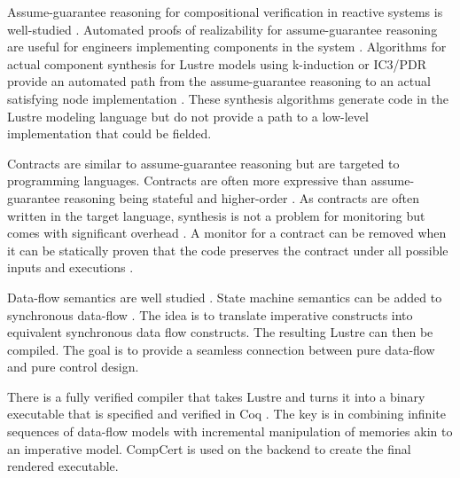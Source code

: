 Assume-guarantee reasoning for compositional verification in reactive systems is well-studied \cite{10.1007/978-3-642-28891-3_13, agree2013, 10.1145/2658982.2527272, 10.1007/978-3-319-17524-9_7}. Automated proofs of realizability for assume-guarantee reasoning are useful for engineers implementing components in the system \cite{10.1007/978-3-319-17524-9_13, 10.1007/978-3-319-29613-5_7}. Algorithms for actual component synthesis for Lustre models using k-induction or IC3/PDR provide an automated path from the assume-guarantee reasoning to an actual satisfying node implementation \cite{katis2017synthesis, 10.1007/978-3-319-89963-3_10}. These synthesis algorithms generate code in the Lustre modeling language but do not provide a path to a low-level implementation that could be fielded.

Contracts are similar to assume-guarantee reasoning but are targeted to programming languages. Contracts are often more expressive than assume-guarantee reasoning being stateful and higher-order \cite{10.1145/583852.581484}. As contracts are often written in the target language, synthesis is not a problem for monitoring but comes with significant overhead \cite{10.1007/978-3-642-28869-2_11}. A monitor for a contract can be removed when it can be statically proven that the code preserves the contract under all possible inputs and executions \cite{10.1145/3158139}.

Data-flow semantics are well studied \cite{10.1145/41625.41641,97300, 10.1145/1379023.1375674,10.1145/2345141.2248426,10.1007/978-3-540-45212-6_10}. State machine semantics can be added to synchronous data-flow \cite{10.1145/1086228.1086261}. The idea is to translate imperative constructs into equivalent synchronous data flow constructs. The resulting Lustre can then be compiled. The goal is to provide a seamless connection between pure data-flow and pure control design.

There is a fully verified compiler that takes Lustre and turns it into a binary executable that is specified and verified in Coq \cite{10.1145/3140587.3062358}. The key is in combining infinite sequences of data-flow models with incremental manipulation of memories akin to an imperative model. CompCert is used on the backend to create the final rendered executable.